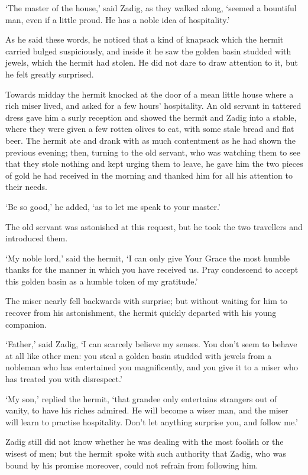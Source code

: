 \documentclass{article}
\begin{document}
\begin{center}
`The master of the house,' said Zadig, as they walked along, `seemed a bountiful 
man, even if a little proud. He has a noble idea of hospitality.' 

As he said these words, he noticed that a kind of knapsack which the hermit carried 
bulged suspiciously, and inside it he saw the golden basin studded with jewels, 
which the hermit had stolen. He did not dare to draw attention to it, but he felt 
greatly surprised. 

Towards midday the hermit knocked at the door of a mean little house where a rich 
miser lived, and asked for a few hours' hospitality. An old servant in tattered 
dress gave him a surly reception and showed the hermit and Zadig into a stable, 
where they were given a few rotten olives to eat, with some stale bread and flat 
beer. The hermit ate and drank with as much contentment as he had shown the previous 
evening; then, turning to the old servant, who was watching them to see that they 
stole nothing and kept urging them to leave, he gave him the two pieces of gold 
he had received in the morning and thanked him for all his attention to their needs. 

`Be so good,' he added, `as to let me speak to your master.' 

The old servant was astonished at this request, but he took the two travellers 
and introduced them. 

`My noble lord,' said the hermit, `I can only give Your Grace the most humble thanks 
for the manner in which you have received us. Pray condescend to accept this golden 
basin as a humble token of my gratitude.' 

The miser nearly fell backwards with surprise; but without waiting for him to recover 
from his astonishment, the hermit quickly departed with his young companion. 

`Father,' said Zadig, `I can scarcely believe my senses. You don't seem to behave 
at all like other men: you steal a golden basin studded with jewels from a nobleman 
who has entertained you magnificently, and you give it to a miser who has treated 
you with disrespect.' 

`My son,' replied the hermit, `that grandee only entertains strangers out of vanity, 
to have his riches admired. He will become a wiser man, and the miser will learn 
to practise hospitality. Don't let anything surprise you, and follow me.' 

Zadig still did not know whether he was dealing with the most foolish or the wisest 
of men; but the hermit spoke with such authority that Zadig, who was bound by his 
promise moreover, could not refrain from following him. 


\end{center}
\end{document}
